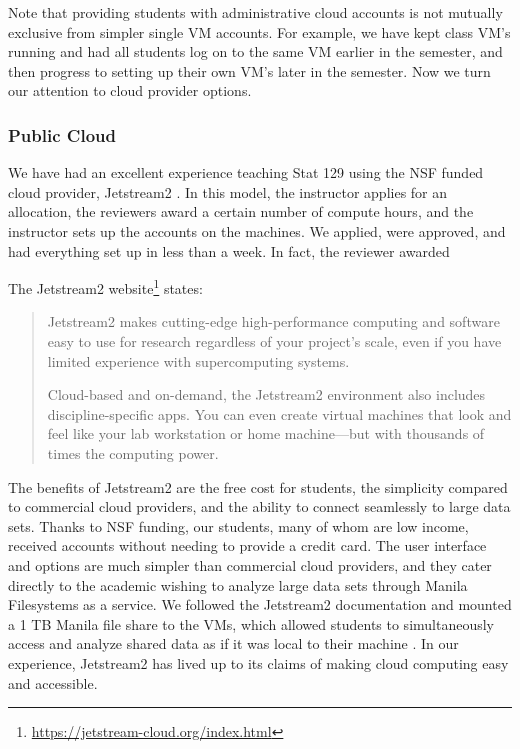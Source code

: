 \documentclass[12pt]{article}
\begin{document}
Note that providing students with administrative cloud accounts is not mutually exclusive from simpler single VM accounts.
For example, we have kept class VM's running and had all students log on to the same VM earlier in the semester, and then progress to setting up their own VM's later in the semester.
Now we turn our attention to cloud provider options.



\subsubsection{Public Cloud}

We have had an excellent experience teaching Stat 129 using the NSF funded cloud provider, Jetstream2 \cite{hancock2021jetstream2}.
In this model, the instructor applies for an allocation, the reviewers award a certain number of compute hours, and the instructor sets up the accounts on the machines.
We applied, were approved, and had everything set up in less than a week.
In fact, the reviewer awarded 

The Jetstream2 website\footnote{\url{https://jetstream-cloud.org/index.html}} states:
\begin{quote}
Jetstream2 makes cutting-edge high-performance computing and software easy to use for research regardless of your project’s scale, even if you have limited experience with supercomputing systems.

Cloud-based and on-demand, the Jetstream2 environment also includes discipline-specific apps. You can even create virtual machines that look and feel like your lab workstation or home machine—but with thousands of times the computing power.
\end{quote}

The benefits of Jetstream2 are the free cost for students, the simplicity compared to commercial cloud providers, and the ability to connect seamlessly to large data sets.
Thanks to NSF funding, our students, many of whom are low income, received accounts without needing to provide a credit card.
The user interface and options are much simpler than commercial cloud providers, and they cater directly to the academic wishing to analyze large data sets through Manila Filesystems as a service.
We followed the Jetstream2 documentation and mounted a 1 TB Manila file share to the VMs, which allowed students to simultaneously access and analyze shared data as if it was local to their machine \cite{manila}.
In our experience, Jetstream2 has lived up to its claims of making cloud computing easy and accessible.
\end{document}
